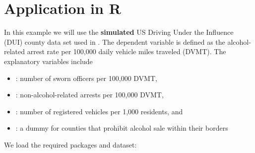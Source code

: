 \documentclass[english,12pt]{book}\usepackage[]{graphicx}\usepackage[]{xcolor}
\begin{document}

\section{Application in R}

In this example we will use the \textbf{simulated} US Driving Under the Influence (DUI) county data set used in \cite{drukker2011command}. The dependent variable  is defined as the alcohol-related arrest rate per 100,000 daily vehicle miles traveled (DVMT). The explanatory variables include 

\begin{itemize}
  \item {}: number of sworn officers per 100,000 DVMT,
  \item {}: non-alcohol-related arrests per 100,000 DVMT,
  \item {}: number of registered vehicles per 1,000 residents, and
  \item {}: a dummy for counties that prohibit alcohol sale within their borders
\end{itemize}

We load the required packages and dataset:
\end{document}
